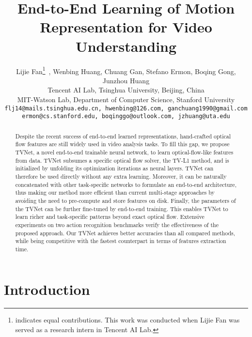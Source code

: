 \documentclass[10pt,twocolumn,letterpaper]{article}
\begin{document}
\title{End-to-End Learning of Motion Representation for Video Understanding}
\author{Lijie Fan\thanks{indicates equal contributions. This work was conducted when Lijie Fan was served as a research intern in Tencent AI Lab.}\ , Wenbing Huang, Chuang Gan, Stefano Ermon, Boqing Gong, Junzhou Huang\\
 Tencent AI Lab,
 Tsinghua University, Beijing, China\\
 MIT-Watson Lab,
 Department of Computer Science, Stanford University \\
{\tt\small flj14@mails.tsinghua.edu.cn, hwenbing@126.com, ganchuang1990@gmail.com}\\
{\tt\small ermon@cs.stanford.edu, boqinggo@outlook.com, jzhuang@uta.edu}
}
\maketitle
\thispagestyle{empty}

\begin{abstract}
Despite the recent success of end-to-end learned representations, hand-crafted optical flow features are still widely used in video analysis tasks.
To fill this gap, we propose TVNet, a novel end-to-end trainable neural network, to learn optical-flow-like features from data.
TVNet subsumes a specific optical flow solver, the TV-L1 method, and is initialized by unfolding its optimization iterations as neural layers.
TVNet can therefore be used directly without any extra learning. Moreover, it can be naturally concatenated with other task-specific networks to formulate an end-to-end architecture, thus making our method more efficient than current multi-stage approaches by avoiding the need to pre-compute and store features on disk.
Finally, the parameters of the TVNet can be further fine-tuned by end-to-end training.
This enables TVNet to learn richer and task-specific patterns beyond exact optical flow.
Extensive experiments on two action recognition benchmarks verify the effectiveness of the proposed approach.  Our TVNet achieves better accuracies than all compared methods, while being competitive with the fastest counterpart in terms of features extraction time.
\end{abstract}





\section{Introduction}
\label{Sec:introduction}
\end{document}
